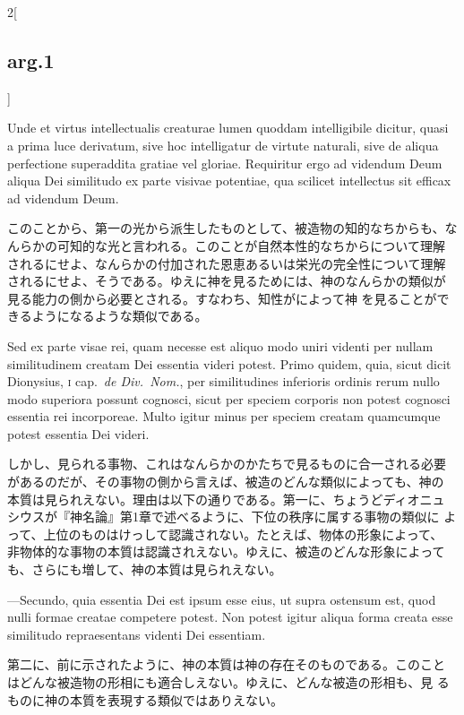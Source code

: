 \documentclass[paper=a4paper,fontsize=10pt,jafontsize=9pt,titlepage]{jlreq}
\begin{document}
\begin{paracol}{2}[\subsection{arg.1}]
\switchcolumn*

Unde et virtus intellectualis creaturae lumen quoddam intelligibile
dicitur, quasi a prima luce derivatum, sive hoc intelligatur de
virtute naturali, sive de aliqua perfectione superaddita gratiae vel
gloriae. Requiritur ergo ad videndum Deum aliqua Dei similitudo ex
parte visivae potentiae, qua scilicet intellectus sit efficax ad
videndum Deum.

\switchcolumn

このことから、第一の光から派生したものとして、被造物の知的なちからも、な
んらかの可知的な光と言われる。このことが自然本性的なちからについて理解
されるにせよ、なんらかの付加された恩恵あるいは栄光の完全性について理解
されるにせよ、そうである。ゆえに神を見るためには、神のなんらかの類似が
見る能力の側から必要とされる。すなわち、知性がによって神
を見ることができるようになるような類似である。

\switchcolumn*

Sed ex parte visae rei, quam necesse est aliquo modo uniri videnti per
nullam similitudinem creatam Dei essentia videri potest. Primo quidem,
quia, sicut dicit Dionysius, {\scshape i} cap.\ {\itshape de Div.\
Nom.}, per similitudines inferioris ordinis rerum nullo modo superiora
possunt cognosci, sicut per speciem corporis non potest cognosci
essentia rei incorporeae. Multo igitur minus per speciem creatam
quamcumque potest essentia Dei videri.

\switchcolumn

しかし、見られる事物、これはなんらかのかたちで見るものに合一される必要
があるのだが、その事物の側から言えば、被造のどんな類似によっても、神の
本質は見られえない。理由は以下の通りである。第一に、ちょうどディオニュ
シウスが『神名論』第1章で述べるように、下位の秩序に属する事物の類似に
よって、上位のものはけっして認識されない。たとえば、物体の形象によって、
非物体的な事物の本質は認識されえない。ゆえに、被造のどんな形象によって
も、さらにも増して、神の本質は見られえない。

\switchcolumn*

---Secundo, quia essentia Dei est ipsum esse eius, ut supra ostensum
est, quod nulli formae creatae competere potest. Non potest igitur
aliqua forma creata esse similitudo repraesentans videnti Dei
essentiam.

\switchcolumn

第二に、前に示されたように、神の本質は神の存在そのものである。このこと
はどんな被造物の形相にも適合しえない。ゆえに、どんな被造の形相も、見
るものに神の本質を表現する類似ではありえない。


\end{paracol}
\end{document}

